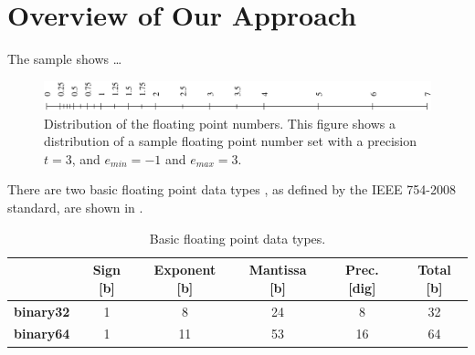\chapter{Overview of Our Approach}
\label{chap.ourapproach}

The sample  shows \dots

\begin{figure}[htb]
\begin{center}
\includegraphics[width=.95\textwidth]{pic/float.pdf}
\end{center}
\caption{Distribution of the floating point numbers. This figure shows a distribution of a sample floating point number set with a precision $t=3$, and $e_{min}=-1$ and $e_{max}=3$.}
\label{fig.float}
\end{figure}


There are two basic floating point  data types , as defined by the IEEE 754-2008 \cite{ieee754} standard, are shown in .

\begin{table}[htb]
\begin{center}
\begin{tabular}{|r|c|c|c||c||c|}
\cline{2-6}

\multicolumn{1}{r|}{} & {\vrule height 13pt depth 6pt width 0pt\textbf{Sign}} [b] & \textbf{Exponent} [b] & \textbf{Mantissa} [b] & \textbf{Prec.} [dig] & \textbf{Total} [b]\\ \cline{2-6}  \hline

\vrule height 10pt depth 20pt width 0pt
\textbf{binary32}   			& 1    & 8        	& 24      & 8  	& 32\\ \hline

\vrule height 20pt depth 0pt width 1pt
\textbf{binary64}   			& 1    & 11       	& 53      & 16	& 64\\ \hline
\end{tabular}
\end{center}
\caption{Basic floating point data types.}
\label{tab.floatingpointdatatypes}
\end{table}
